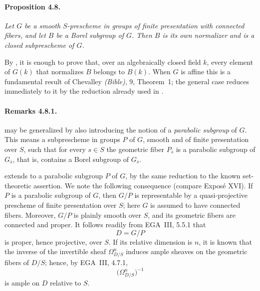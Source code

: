 \paragraph{\textbf{Proposition 4.8.}}
{\itshape Let \(G\) be a smooth \(S\)-prescheme in groups of finite
presentation with connected fibers, and let \(B\) be a Borel
subgroup of \(G\). Then \(B\) is its own normalizer and is a closed
subprescheme of \(G\).}

By , it is enough to prove that, over an algebraically
closed field \(k\), every element of \(G(k)\) that normalizes \(B\)
belongs to \(B(k)\). When \(G\) is affine this is a fundamental
result of Chevalley
\textup{\emph{(Bible)}, 9, Theorem~1}; the general case reduces
immediately to it by the reduction already used in .

\paragraph{\textbf{Remarks 4.8.1.}}
 may be generalized by also introducing the notion
of a \emph{parabolic subgroup} of \(G\). This means a subprescheme
in groups \(P\) of \(G\), smooth and of finite presentation over
\(S\), such that for every \(s\in S\) the geometric fiber
\(P_{\bar s}\) is a parabolic subgroup of \(G_{\bar s}\), that is,
contains a Borel subgroup of \(G_{\bar s}\).

 extends to a parabolic subgroup \(P\) of \(G\), by
the same reduction to the known set-theoretic assertion. We note
the following consequence \textup{(compare Exposé XVI)}. If \(P\)
is a parabolic subgroup of \(G\), then \(G/P\) is representable by
a quasi-projective prescheme of finite presentation over \(S\);
here \(G\) is assumed to have connected fibers. Moreover, \(G/P\)
is plainly smooth over \(S\), and its geometric fibers are
connected and proper. It follows readily from EGA~III, 5.5.1 that
\[
  D=G/P
\]
is proper, hence projective, over \(S\). If its relative dimension
is \(n\), it is known that the inverse of the invertible sheaf
\(\Omega^n_{D/S}\) induces ample sheaves on the geometric fibers of
\(D/S\); hence, by EGA~III, 4.7.1,
\[
  \bigl(\Omega^n_{D/S}\bigr)^{-1}
\]
is ample on \(D\) relative to \(S\).
